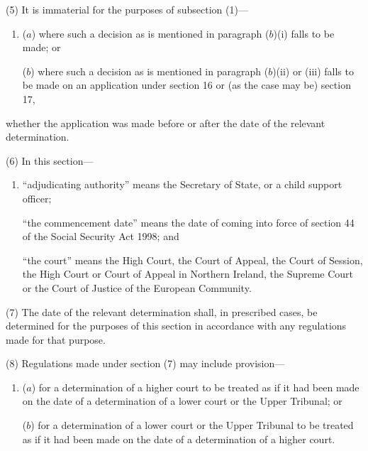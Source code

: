 \documentclass[12pt,a4paper]{article}
\begin{document}
(5) It is immaterial for the purposes of subsection (1)---
\begin{enumerate}\item[]
($a$) where such a decision as is mentioned in paragraph ($b$)(i) falls to be made; or

($b$) where such a decision as is mentioned in paragraph ($b$)(ii) or (iii) falls to be made on an application under section 16 or (as the case may be) section 17,
\end{enumerate}
whether the application was made before or after the date of the relevant determination.

(6) In this section---
\begin{enumerate}\item[]
 “adjudicating authority” means the Secretary of State, or a child support officer; 

“the commencement date” means the date of coming into force of section 44 of the Social Security Act 1998; and 

“the court” means the High Court, the Court of Appeal, the Court of Session, the High Court or Court of Appeal in Northern Ireland, the Supreme Court or the Court of Justice of the European Community.
\end{enumerate}

(7) The date of the relevant determination shall, in prescribed cases, be determined for the purposes of this section in accordance with any regulations made for that purpose.

(8) Regulations made under section (7) may include provision---
\begin{enumerate}\item[]
($a$) for a determination of a higher court to be treated as if it had been made on the date of a determination of a lower court or the Upper Tribunal; or

($b$) for a determination of a lower court or the Upper Tribunal to be treated as if it had been made on the date of a determination of a higher court.
\end{enumerate}
\end{document}
